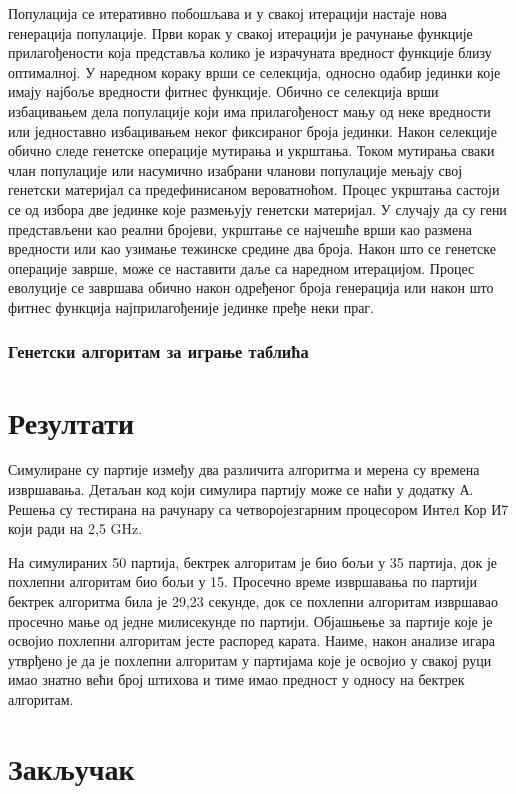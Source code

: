 \documentclass[a4paper, 12pt, ngerman]{article}
\let\oldsection\section
\renewcommand\section{\clearpage\oldsection}
\begin{document}
Популација се итеративно побошљава и у свакој итерацији настаје нова генерација популације. Први корак у свакој итерацији је рачунање функције прилагођености која представља колико је израчуната вредност функције близу оптималној. У наредном кораку врши се селекција, односно одабир јединки које имају најбоље вредности фитнес функције. Обично се селекција врши избацивањем дела популације који има прилагођеност мању од неке вредности или једноставно избацивањем неког фиксираног броја јединки.  Након селекције обично следе генетске операције мутирања и укрштања. Током мутирања сваки члан популације или насумично изабрани чланови популације мењају свој генетски материјал са предефинисаном вероватноћом. Процес укрштања састоји се од избора две јединке које размењују генетски материјал. У случају да су гени представљени као реални бројеви, укрштање се најчешће врши као размена вредности или као узимање тежинске средине два броја. Након што се генетске операције заврше, може се наставити даље са наредном итерацијом. Процес еволуције се завршава обично након одређеног броја генерација или након што фитнес функција најприлагођеније јединке пређе неки праг.

\subsubsection{Генетски алгоритам за играње таблића}


\section{Резултати}
Симулиране су партије између два различита алгоритма и мерена су времена извршавања. Детаљан код који симулира партију може се наћи у додатку А. Решења су тестирана на рачунару са четворојезгарним процесором Интел Кор И7 који ради на 2,5 GHz.

На симулираних 50 партија, бектрек алгоритам је био бољи у 35 партија, док је похлепни алгоритам био бољи у 15. Просечно време извршавања по партији бектрек алгоритма била је 29,23 секунде, док се похлепни алгоритам извршавао просечно мање од једне милисекунде по партији. Објашњење за партије које је освојио похлепни алгоритам јесте распоред карата. Наиме, након анализе игара утврђено је да је похлепни алгоритам у партијама које је освојио у свакој руци имао знатно већи број штихова и тиме имао предност у односу на бектрек алгоритам.



\section{Закључак}
\end{document}

